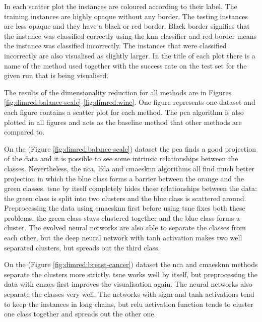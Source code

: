 \documentclass[12pt,a4paper]{report}
\begin{document}
In each scatter plot the instances are coloured according to their label. The training instances are highly opaque without any border. The testing instances are less opaque and they have a black or red border. Black border signifies that the instance was classified correctly using the \ac{knn} classifier and red border means the instance was classified incorrectly. The instances that were classified incorrectly are also visualised as slightly larger. In the title of each plot there is a name of the method used together with the success rate on the test set for the given run that is being visualised.

The results of the dimensionality reduction for all methods are in Figures \ref{fig:dimred:balance-scale}-\ref{fig:dimred:wine}. One figure represents one dataset and each figure contains a scatter plot for each method. The \ac{pca} algorithm is also plotted in all figures and acts as the baseline method that other methods are compared to. 

On the  (Figure \ref{fig:dimred:balance-scale}) dataset the \ac{pca} finds a good projection of the data and it is possible to see some intrinsic relationships between the classes. Nevertheless, the \ac{nca}, \ac{lfda} and \ac{cmaesknn} algorithms all find much better projection in which the blue class forms a barrier between the orange and the green classes. \ac{tsne} by itself completely hides these relationships between the data: the green class is split into two clusters and the blue class is scattered around. Preprocessing the data using \ac{cmaesknn} first before using \ac{tsne} fixes both these problems, the green class stays clustered together and the blue class forms a cluster. The evolved neural networks are also able to separate the classes from each other, but the deep neural network with \ac{tanh} activation makes two well separated clusters, but spreads out the third class.

On the  (Figure \ref{fig:dimred:breast-cancer}) dataset the \ac{nca} and \ac{cmaesknn} methods separate the clusters more strictly. \ac{tsne} works well by itself, but preprocessing the data with \ac{cmaes} first improves the visualisation again. The neural networks also separate the classes very well. The networks with \ac{sigm} and \ac{tanh} activations tend to keep the instances in long chains, but \ac{relu} activation function tends to cluster one class together and spreads out the other one.
\end{document}
